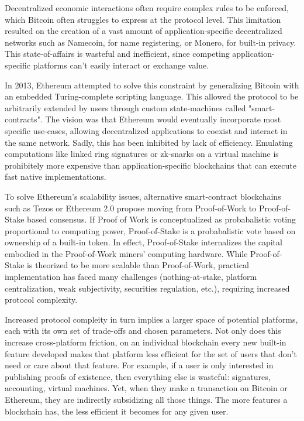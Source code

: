 \documentclass{article}
\theoremstyle{definition}
\theoremstyle{theorem}
\begin{document}
Decentralized economic interactions often require complex rules to be enforced,
which Bitcoin often struggles to express at the protocol level. This limitation
resulted on the creation of a vast amount of application-specific decentralized
networks such as Namecoin, for name registering, or Monero, for built-in
privacy. This state-of-affairs is wasteful and inefficient, since competing
application-specific platforms can't easily interact or exchange value.

In 2013, Ethereum attempted to solve this constraint by generalizing Bitcoin
with an embedded Turing-complete scripting language. This allowed the protocol
to be arbitrarily extended by users through custom state-machines called
"smart-contracts". The vision was that Ethereum would eventually incorporate
most specific use-cases, allowing decentralized applications to coexist and
interact in the same network. Sadly, this has been inhibited by lack of
efficiency. Emulating computations like linked ring signatures or zk-snarks on
a virtual machine is prohibitely more expensive than application-specific
blockchains that can execute fast native implementations.

To solve Ethereum's scalability issues, alternative smart-contract blockchains
such as Tezos or Ethereum 2.0 propose moving from Proof-of-Work to 
Proof-of-Stake based consensus. If Proof of Work is conceptualized as
probabalistic voting proportional to computing power, Proof-of-Stake is a
probabalistic vote based on ownership of a built-in token. In effect,
Proof-of-Stake internalizes the capital embodied in the Proof-of-Work miners'
computing hardware. While Proof-of-Stake is theorized to be more scalable than
Proof-of-Work, practical implementation has faced many challenges
(nothing-at-stake, platform centralization, weak subjectivity, securities
regulation, etc.), requiring increased protocol complexity.

Increased protocol compleity in turn implies a larger space of potential
platforms, each with its own set of trade-offs and chosen parameters. Not only
does this increase cross-platform friction, on an individual blockchain every
new built-in feature developed makes that platform less efficient for the set of
users that don't need or care about that feature. For example, if a user is
only interested in publishing proofs of existence, then everything else is
wasteful: signatures, accounting, virtual machines. Yet, when they make a
transaction on Bitcoin or Ethereum, they are indirectly subsidizing all those
things. The more features a blockchain has, the less efficient it becomes for
any given user.
\end{document}

